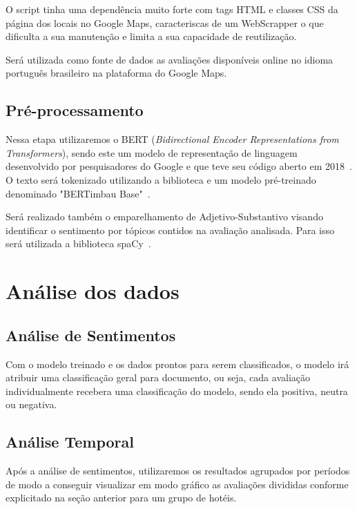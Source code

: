 O script tinha uma dependência muito forte com tags HTML e classes CSS da página dos locais no Google Maps, caracteriscas de um WebScrapper o que dificulta a sua manutenção e limita a sua capacidade de reutilização.

Será utilizada como fonte de dados as avaliações disponíveis online no idioma português brasileiro na plataforma do Google Maps.
%



\subsection{Pré-processamento}
\label{subsec:pre_processamento}


Nessa etapa utilizaremos o BERT (\emph{Bidirectional Encoder Representations from Transformers}), sendo este um modelo de representação de linguagem desenvolvido por pesquisadores do Google e que teve seu código aberto em 2018~\cite{hugoZanini2021mediu}. O texto será tokenizado utilizando a biblioteca e um modelo pré-treinado denominado "BERTimbau Base"~\cite{souza2020bertimbau}.

Será realizado também o emparelhamento de Adjetivo-Substantivo visando identificar o sentimento por tópicos contidos na avaliação analisada. Para isso será utilizada a biblioteca spaCy~\cite{montani2022spacy}. 

\section{Análise dos dados}

\subsection{Análise de Sentimentos}
\label{subsec:analise_sentimentos}

Com o modelo treinado e os dados prontos para serem classificados, o modelo irá atribuir uma classificação geral para documento, ou seja, cada avaliação individualmente recebera uma classificação do modelo, sendo ela positiva, neutra ou negativa.

\subsection{Análise Temporal}
\label{subsec:analise_temporal}
Após a análise de sentimentos, utilizaremos os resultados agrupados por períodos de modo a conseguir visualizar em modo gráfico as avaliações divididas conforme explicitado na seção anterior para um grupo de hotéis.

